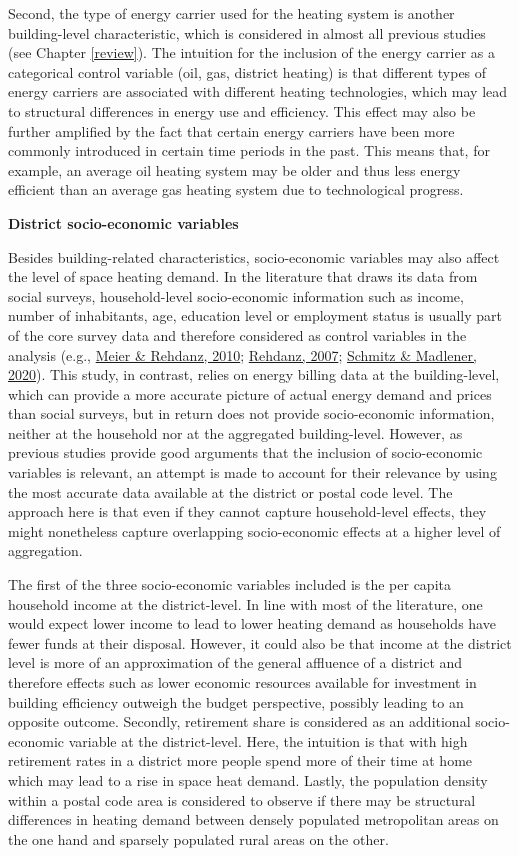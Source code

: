 \documentclass[12pt,twoside]{reedthesis}
\begin{document}
Second, the type of energy carrier used for the heating system is another building-level characteristic, which is considered in almost all previous studies (see Chapter \ref{review}). The intuition for the inclusion of the energy carrier as a categorical control variable (oil, gas, district heating) is that different types of energy carriers are associated with different heating technologies, which may lead to structural differences in energy use and efficiency. This effect may also be further amplified by the fact that certain energy carriers have been more commonly introduced in certain time periods in the past. This means that, for example, an average oil heating system may be older and thus less energy efficient than an average gas heating system due to technological progress.

\textbf{District socio-economic variables}

Besides building-related characteristics, socio-economic variables may also affect the level of space heating demand. In the literature that draws its data from social surveys, household-level socio-economic information such as income, number of inhabitants, age, education level or employment status is usually part of the core survey data and therefore considered as control variables in the analysis (e.g., \protect\hyperlink{ref-meier_rehdanz10}{Meier \& Rehdanz, 2010}; \protect\hyperlink{ref-rehdanz07}{Rehdanz, 2007}; \protect\hyperlink{ref-schmitz_madlener20}{Schmitz \& Madlener, 2020}). This study, in contrast, relies on energy billing data at the building-level, which can provide a more accurate picture of actual energy demand and prices than social surveys, but in return does not provide socio-economic information, neither at the household nor at the aggregated building-level. However, as previous studies provide good arguments that the inclusion of socio-economic variables is relevant, an attempt is made to account for their relevance by using the most accurate data available at the district or postal code level. The approach here is that even if they cannot capture household-level effects, they might nonetheless capture overlapping socio-economic effects at a higher level of aggregation.

The first of the three socio-economic variables included is the per capita household income at the district-level. In line with most of the literature, one would expect lower income to lead to lower heating demand as households have fewer funds at their disposal. However, it could also be that income at the district level is more of an approximation of the general affluence of a district and therefore effects such as lower economic resources available for investment in building efficiency outweigh the budget perspective, possibly leading to an opposite outcome. Secondly, retirement share is considered as an additional socio-economic variable at the district-level. Here, the intuition is that with high retirement rates in a district more people spend more of their time at home which may lead to a rise in space heat demand. Lastly, the population density within a postal code area is considered to observe if there may be structural differences in heating demand between densely populated metropolitan areas on the one hand and sparsely populated rural areas on the other.
\end{document}
